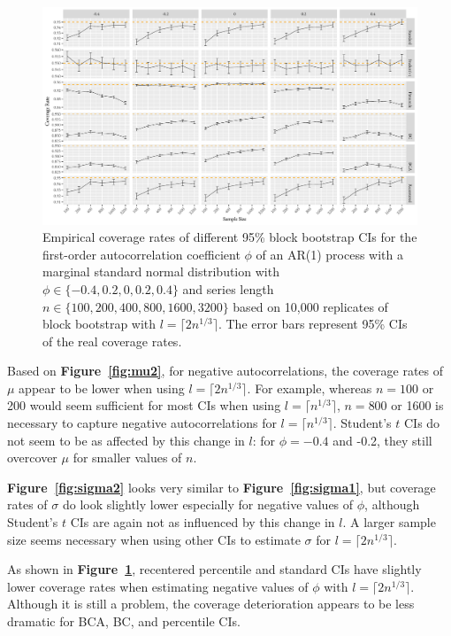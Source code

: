 \documentclass[12pt]{article}
\begin{document}
\begin{figure}[tbp]
  \centering
  \includegraphics[width=\textwidth]{figures/plot_norm_phi_2}
  \caption{Empirical coverage rates of different 95\% block bootstrap CIs for 
    the first-order autocorrelation coefficient $\phi$ of an AR(1) process with 
    a marginal standard normal distribution with 
    $\phi \in \{-0.4, 0.2, 0, 0.2, 0.4\}$ and series length
    $n \in \{100, 200, 400, 800, 1600, 3200\}$ based on 10,000 replicates of
    block bootstrap with $l = \lceil 2n^{1/3} \rceil$. The
    error bars represent 95\% CIs of the real coverage rates.}
  \label{fig:phi2}
\end{figure}

Based on \textbf{Figure~\ref{fig:mu2}}, for negative autocorrelations, the 
coverage 
rates of $\mu$ appear to be lower when
using $l = \lceil 2n^{1/3} \rceil$. For example, whereas $n = 100$ or 200 
would seem sufficient for most CIs when using $l = \lceil n^{1/3} \rceil$, 
$n = 800$ or 1600 is necessary to capture negative autocorrelations for 
$l = \lceil n^{1/3} \rceil$. Student's $t$ CIs do not seem to be as affected
by this change in $l$: for $\phi = -0.4$ and -0.2, they still overcover $\mu$
for smaller values of $n$. 

\textbf{Figure~\ref{fig:sigma2}} looks very similar to 
\textbf{Figure~\ref{fig:sigma1}}, but coverage rates of $\sigma$ do look 
slightly lower
especially for negative values of $\phi$, although Student's $t$ CIs are again
not as influenced by this change in $l$. A larger sample size seems necessary
when using other CIs to estimate $\sigma$ for $l = \lceil 2n^{1/3} \rceil$.

As shown in \textbf{Figure~\ref{fig:phi2}},
recentered percentile and standard CIs have slightly lower coverage rates when
estimating negative values of $\phi$ with $l = \lceil 2n^{1/3} \rceil$. 
Although it is still a problem, the coverage deterioration appears to be less 
dramatic for BCA,
BC, and percentile CIs.
\end{document}
